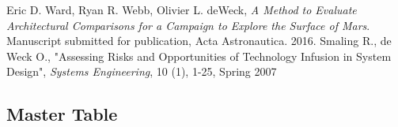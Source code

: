 \documentclass[11pt]{article} %
\begin{document}
\clearpage
\begin{thebibliography}{1}
 Eric D. Ward, Ryan R. Webb, Olivier L. deWeck, {\em A Method to Evaluate Architectural Comparisons for a Campaign to Explore the Surface of Mars}. Manuscript submitted for publication, Acta Astronautica. 2016.
Smaling R., de Weck O., "Assessing Risks and Opportunities of Technology Infusion in System Design", {\em Systems Engineering}, 10 (1), 1-25, Spring 2007
\end{thebibliography}

\clearpage
\begin{appendices}
\section{Master Table}

\end{appendices}
\end{document}
